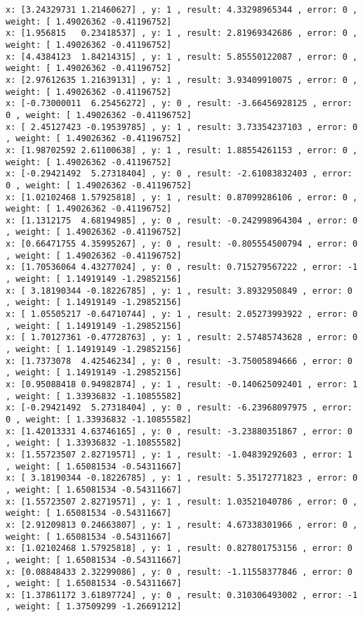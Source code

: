 \documentclass[11pt]{article}
\begin{document}
\begin{Verbatim}[commandchars=\\\{\}]
x: [3.24329731 1.21460627] , y: 1 , result: 4.33298965344 , error: 0 , weight: [ 1.49026362 -0.41196752]
x: [1.956815   0.23418537] , y: 1 , result: 2.81969342686 , error: 0 , weight: [ 1.49026362 -0.41196752]
x: [4.4384123  1.84214315] , y: 1 , result: 5.85550122087 , error: 0 , weight: [ 1.49026362 -0.41196752]
x: [2.97612635 1.21639131] , y: 1 , result: 3.93409910075 , error: 0 , weight: [ 1.49026362 -0.41196752]
x: [-0.73000011  6.25456272] , y: 0 , result: -3.66456928125 , error: 0 , weight: [ 1.49026362 -0.41196752]
x: [ 2.45127423 -0.19539785] , y: 1 , result: 3.73354237103 , error: 0 , weight: [ 1.49026362 -0.41196752]
x: [1.98702592 2.61100638] , y: 1 , result: 1.88554261153 , error: 0 , weight: [ 1.49026362 -0.41196752]
x: [-0.29421492  5.27318404] , y: 0 , result: -2.61083832403 , error: 0 , weight: [ 1.49026362 -0.41196752]
x: [1.02102468 1.57925818] , y: 1 , result: 0.87099286106 , error: 0 , weight: [ 1.49026362 -0.41196752]
x: [1.1312175  4.68194985] , y: 0 , result: -0.242998964304 , error: 0 , weight: [ 1.49026362 -0.41196752]
x: [0.66471755 4.35995267] , y: 0 , result: -0.805554500794 , error: 0 , weight: [ 1.49026362 -0.41196752]
x: [1.70536064 4.43277024] , y: 0 , result: 0.715279567222 , error: -1 , weight: [ 1.14919149 -1.29852156]
x: [ 3.18190344 -0.18226785] , y: 1 , result: 3.8932950849 , error: 0 , weight: [ 1.14919149 -1.29852156]
x: [ 1.05505217 -0.64710744] , y: 1 , result: 2.05273993922 , error: 0 , weight: [ 1.14919149 -1.29852156]
x: [ 1.70127361 -0.47728763] , y: 1 , result: 2.57485743628 , error: 0 , weight: [ 1.14919149 -1.29852156]
x: [1.7373078  4.42546234] , y: 0 , result: -3.75005894666 , error: 0 , weight: [ 1.14919149 -1.29852156]
x: [0.95088418 0.94982874] , y: 1 , result: -0.140625092401 , error: 1 , weight: [ 1.33936832 -1.10855582]
x: [-0.29421492  5.27318404] , y: 0 , result: -6.23968097975 , error: 0 , weight: [ 1.33936832 -1.10855582]
x: [1.42013331 4.63746165] , y: 0 , result: -3.23880351867 , error: 0 , weight: [ 1.33936832 -1.10855582]
x: [1.55723507 2.82719571] , y: 1 , result: -1.04839292603 , error: 1 , weight: [ 1.65081534 -0.54311667]
x: [ 3.18190344 -0.18226785] , y: 1 , result: 5.35172771823 , error: 0 , weight: [ 1.65081534 -0.54311667]
x: [1.55723507 2.82719571] , y: 1 , result: 1.03521040786 , error: 0 , weight: [ 1.65081534 -0.54311667]
x: [2.91209813 0.24663807] , y: 1 , result: 4.67338301966 , error: 0 , weight: [ 1.65081534 -0.54311667]
x: [1.02102468 1.57925818] , y: 1 , result: 0.827801753156 , error: 0 , weight: [ 1.65081534 -0.54311667]
x: [0.08848433 2.32299086] , y: 0 , result: -1.11558377846 , error: 0 , weight: [ 1.65081534 -0.54311667]
x: [1.37861172 3.61897724] , y: 0 , result: 0.310306493002 , error: -1 , weight: [ 1.37509299 -1.26691212]

    \end{Verbatim}
\end{document}
